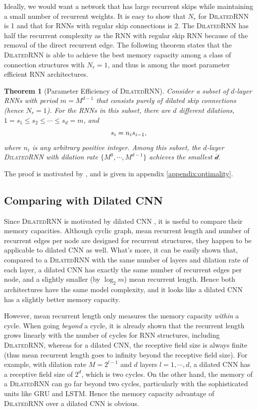 \documentclass{article}
\newtheorem{theorem}{Theorem}[section]
\newcommand{\algname}{\textsc{DilatedRNN }}
\newcommand{\algnamens}{\textsc{DilatedRNN}}
\begin{document}
Ideally, we would want a network that has large recurrent skips while maintaining a small number of recurrent weights. It is easy to show that $N_r$ for \algname is 1 and that for RNNs with regular skip connections is 2. The \algname has half the recurrent complexity as the RNN with regular skip RNN because of the removal of the direct recurrent edge.  The following theorem states that the \algname is able to achieve the best memory capacity among a class of connection structures with $N_r = 1$, and thus is among the most parameter efficient RNN architectures.
\begin{theorem}[Parameter Efficiency of \algnamens]
Consider a subset of $d$-layer RNNs with period $m = M^{d-1}$ that consists purely of dilated skip connections (hence $N_r = 1$). For the RNNs in this subset, there are $d$ different dilations, $1=s_1 \leq s_2 \leq \cdots \leq s_d=m$, and
\begin{equation}
\small
s_i = n_i s_{i-1},
\label{eq:skip_ratio}
\end{equation}
where $n_i$ is any arbitrary positive integer. Among this subset, the $d$-layer \algname with dilation rate $\{M^0, \cdots, M^{d-1}\}$ achieves the smallest $\bar{\mathcal{d}}$.
\label{thm:efficiency}
\end{theorem}
The proof is motivated by \cite{caianiello1982systemic}, and is given in appendix \ref{appendix:optimality}.

\subsection{Comparing with Dilated CNN}
\label{subsec:compare_CNN}

Since \algname is motivated by dilated CNN \cite{van2016wavenet, yu2015multi}, it is useful to compare their memory capacities.  Although cyclic graph, mean recurrent length and number of recurrent edges per node are designed for recurrent structures, they happen to be applicable to dilated CNN as well.  What's more, it can be easily shown that, compared to a \algname with the same number of layers and dilation rate of each layer, a dilated CNN has exactly the same number of recurrent edges per node, and a slightly smaller (by $\log_2 m$) mean recurrent length. Hence both architectures have the same model complexity, and it looks like a dilated CNN has a slightly better memory capacity.

However, mean recurrent length only measures the memory capacity \emph{within} a cycle. When going \emph{beyond} a cycle, it is already shown that the recurrent length grows linearly with the number of cycles \cite{zhang2016architectural} for RNN structures, including \algnamens, whereas for a dilated CNN, the receptive field size is always finite (thus mean recurrent length goes to infinity beyond the receptive field size).  For example, with dilation rate $M = 2^{l-1}$ and $d$ layers $l = 1, \cdots, d$, a dilated CNN has a receptive field size of $2^d$, which is two cycles.  On the other hand, the memory of a \algname can go far beyond two cycles, particularly with the sophisticated units like GRU and LSTM. Hence the memory capacity advantage of \algname over a dilated CNN is obvious.
\end{document}
